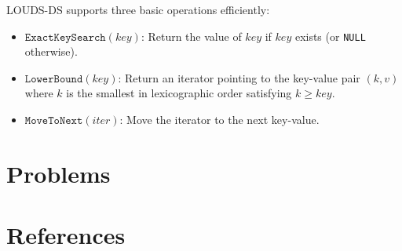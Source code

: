 \documentclass[11pt]{article}
\begin{document}
LOUDS-DS supports three basic operations efficiently:
\begin{itemize}
\item \(\texttt{ExactKeySearch}(key)\): Return the value of \(key\) if \(key\) exists (or \texttt{NULL} otherwise).
\item \(\texttt{LowerBound}(key)\): Return an iterator pointing to the key-value pair \((k,v)\) where
\(k\) is the smallest in lexicographic order satisfying \(k\ge key\).
\item \(\texttt{MoveToNext}(iter)\): Move the iterator to the next key-value.
\end{itemize}
\section{Problems}
\label{sec:orga63aa68}


\section{References}
\label{sec:org9f9e17a}
\label{bibliographystyle link}


\label{bibliography link}

\end{document}
